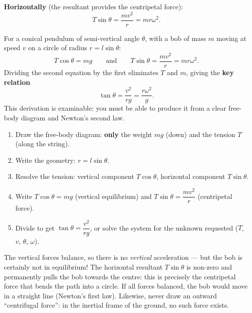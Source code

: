 \documentclass[11pt]{article}
\begin{document}
\textbf{Horizontally} (the resultant provides the centripetal force):
\[ T\sin\theta = \frac{mv^{2}}{r} = mr\omega^{2}. \]

\begin{propriete}
For a conical pendulum of semi-vertical angle $\theta$, with a bob of mass $m$ moving at speed $v$ on a circle of radius $r=l\sin\theta$:
\[ T\cos\theta = mg \qquad\text{and}\qquad T\sin\theta = \frac{mv^{2}}{r}=mr\omega^{2}. \]
Dividing the second equation by the first eliminates $T$ and $m$, giving the \textbf{key relation}
\[ \tan\theta = \frac{v^{2}}{rg} = \frac{r\omega^{2}}{g}. \]
This derivation is examinable: you must be able to produce it from a clear free-body diagram and Newton's second law.
\end{propriete}

\begin{methode}
\begin{enumerate}
\item Draw the free-body diagram: \textbf{only} the weight $mg$ (down) and the tension $T$ (along the string).
\item Write the geometry: $r=l\sin\theta$.
\item Resolve the tension: vertical component $T\cos\theta$, horizontal component $T\sin\theta$.
\item Write $T\cos\theta = mg$ (vertical equilibrium) and $T\sin\theta = \dfrac{mv^{2}}{r}$ (centripetal force).
\item Divide to get $\tan\theta=\dfrac{v^{2}}{rg}$, or solve the system for the unknown requested ($T$, $v$, $\theta$, $\omega$).
\end{enumerate}
\end{methode}

\begin{attention}
The vertical forces balance, so there is no \emph{vertical} acceleration — but the bob is certainly not in equilibrium! The horizontal resultant $T\sin\theta$ is non-zero and permanently pulls the bob towards the centre: this is precisely the centripetal force that bends the path into a circle. If all forces balanced, the bob would move in a straight line (Newton's first law). Likewise, never draw an outward ``centrifugal force'': in the inertial frame of the ground, no such force exists.
\end{attention}
\end{document}
